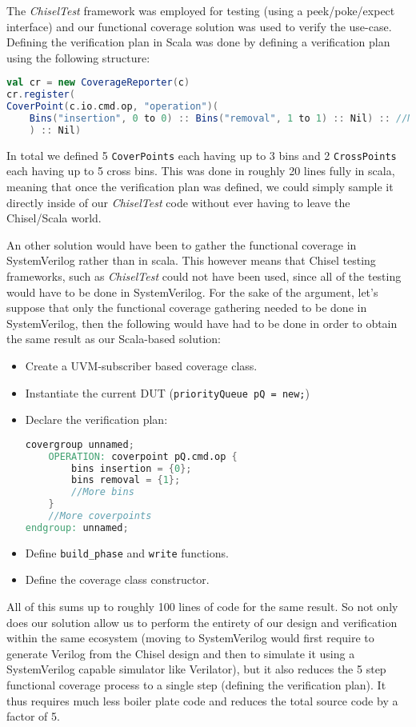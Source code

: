 \documentclass[conference]{IEEEtran}
\begin{document}
The \textit{ChiselTest} framework was employed for testing (using a peek/poke/expect interface) and our functional coverage solution was used to verify the use-case. Defining the verification plan in Scala was done by defining a verification plan using the following structure:  
\begin{lstlisting}[language=scala]
val cr = new CoverageReporter(c)
cr.register(
CoverPoint(c.io.cmd.op, "operation")(
    Bins("insertion", 0 to 0) :: Bins("removal", 1 to 1) :: Nil) :: //More CoverPoints
    ) :: Nil)
\end{lstlisting}
In total we defined 5 \texttt{CoverPoints} each having up to 3 bins and 2 \texttt{CrossPoints} each having up to 5 cross bins. This was done in roughly 20 lines fully in scala, meaning that once the verification plan was defined, we could simply sample it directly inside of our \textit{ChiselTest} code without ever having to leave the Chisel/Scala world.

An other solution would have been to gather the functional coverage in SystemVerilog rather than in scala. This however means that Chisel testing frameworks, such as \textit{ChiselTest} could not have been used, since all of the testing would have to be done in SystemVerilog. For the sake of the argument, let's suppose that only the functional coverage gathering needed to be done in SystemVerilog, then the following would have had to be done in order to obtain the same result as our Scala-based solution:  
\begin{itemize}
    \item Create a UVM-subscriber based coverage class.
    \item Instantiate the current DUT (\texttt{priorityQueue pQ  = new;})
    \item Declare the verification plan: 
    \begin{lstlisting}[language=verilog]
covergroup unnamed;
	OPERATION: coverpoint pQ.cmd.op {
		bins insertion = {0};
		bins removal = {1};
		//More bins
	}
	//More coverpoints
endgroup: unnamed;
    \end{lstlisting}
    \item Define \texttt{build\_phase} and \texttt{write} functions.
    \item Define the coverage class constructor.
\end{itemize}  
All of this sums up to roughly 100 lines of code for the same result. So not only does our solution allow us to perform the entirety of our design and verification within the same ecosystem (moving to SystemVerilog would first require to generate Verilog from the Chisel design and then to simulate it using a SystemVerilog capable simulator like Verilator), but it also reduces the 5 step functional coverage process to a single step (defining the verification plan). It thus requires much less boiler plate code and reduces the total source code by a factor of 5.  
\end{document}
